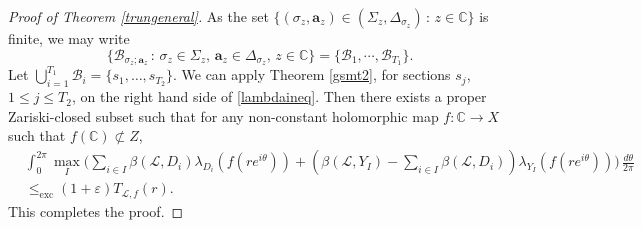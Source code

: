 \documentclass[10pt]{amsart}
\numberwithin{equation}{section}
\theoremstyle{plain}
\theoremstyle{definition}
\begin{document}
\begin{proof}[Proof of Theorem \ref{trungeneral}]
 
As the set  $\{(\sigma_z, \mathbf{a}_z)\in (\Sigma_z, \Delta_{\sigma_z})\,:\,z\in\mathbb C\}$ is finite, we may write  
$$\{ \mathcal{B}_{\sigma_z; \mathbf{a}_z} \,:\, \sigma_z\in\Sigma_z,\, \mathbf a_z \in \Delta_{\sigma_z}, \,  z\in\mathbb C\}=\{ \mathcal B_1,\cdots, \mathcal B_{T_1}\}.
$$
Let $\bigcup_{i=1}^{T_1}\mathcal B_i=\{s_1, \dots, s_{T_2}\}.$ 
We can apply  Theorem \ref{gsmt2}, for sections $s_j$, $1\le j\le T_2$, on the right hand side of \eqref{lambdaineq}. Then there exists a proper  Zariski-closed subset such that for any non-constant holomorphic map $f:\mathbb{C}\to X$ such that  $f(\mathbb{C})\not\subset Z$, 
 \begin{align*}
&\int_0^{2\pi} \max_{I} \Bigg(
    \sum_{i \in I} \beta(\mathscr{L}, D_i) \lambda_{D_i}(f(re^{i\theta})) 
    + \left( \beta(\mathscr{L}, Y_I) - \sum_{i \in I} \beta(\mathscr{L}, D_i) \right) \lambda_{Y_I}(f(re^{i\theta}))
\Bigg) \, \frac{d\theta}{2\pi} \\
&\leq_{\operatorname{exc}} (1 + \varepsilon) T_{\mathscr{L}, f}(r).
\end{align*}
 This completes the proof.
\end{proof}

 
\end{document}
